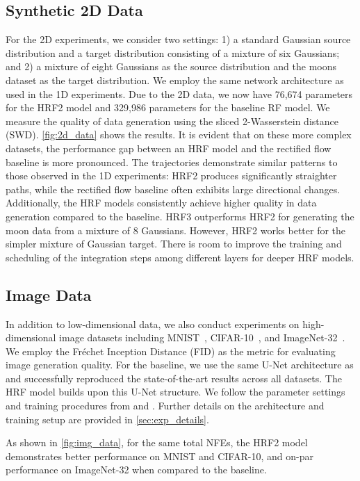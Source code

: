 \subsection{Synthetic 2D Data}
\label{sec:exp:2D}
For the 2D experiments, we consider two settings: 1) a standard Gaussian source distribution and a target distribution consisting of a mixture of six Gaussians; and 2) a mixture of eight Gaussians as the source distribution and the moons dataset as the target distribution. We employ the same network architecture as used in the 1D experiments. Due to the 2D data, we now have 76,674 parameters for the HRF2 model and 329,986 parameters for the baseline RF model. We measure the quality of data generation using the sliced 2-Wasserstein distance (SWD). \cref{fig:2d_data} shows the results. It is evident that on these more complex datasets, the performance gap between an HRF model and the rectified flow baseline is more pronounced. The trajectories demonstrate similar patterns to those observed in the 1D experiments: HRF2 produces significantly straighter paths, while the rectified flow baseline often exhibits large directional changes. Additionally, the HRF models consistently achieve higher quality in data generation compared to the baseline. %
HRF3 outperforms HRF2 for generating the moon data from a mixture of 8 Gaussians. However, HRF2 works better for the simpler mixture of Gaussian target. There is  room to improve the training and scheduling of the integration steps among different layers for deeper HRF models.  %


\subsection{Image Data}
\label{sec:exp:img}
In addition to low-dimensional data, we also conduct experiments on high-dimensional image datasets including MNIST~\citep{lecun1998gradient}, CIFAR-10~\citep{krizhevsky2009learning}, and ImageNet-32~\citep{deng2009imagenet}. We employ the Fr\'{e}chet Inception Distance (FID) as the metric for evaluating image generation quality. 
For the baseline, we use the same U-Net architecture as \citet{LipmanICLR2023} and successfully reproduced the state-of-the-art results across all datasets. The HRF model builds upon this U-Net structure. 
We follow the parameter settings and training procedures from \citet{tong2023improving} and \citet{LipmanICLR2023}. Further details on the architecture and training setup are provided in \cref{sec:exp_details}. 

As shown in \cref{fig:img_data}, for the same total NFEs, the HRF2 model demonstrates better performance on MNIST and CIFAR-10, and on-par performance on ImageNet-32 when compared to the baseline. 

